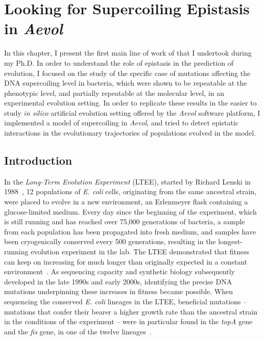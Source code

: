 \chapter{Looking for Supercoiling Epistasis in \emph{Aevol}}
\label{chap:aevol}

In this chapter, I present the first main line of work of that I undertook during my Ph.D.
In order to understand the role of epistasis in the prediction of evolution, I focused on the study of the specific case of mutations affecting the DNA supercoiling level in bacteria, which were shown to be repeatable at the phenotypic level,  and partially repeatable at the molecular level, in an experimental evolution setting.
In order to replicate these results in the easier to study \emph{in silico} artificial evolution setting offered by the \emph{Aevol} software platform, I implemented a model of supercoiling in \emph{Aevol}, and tried to detect epistatic interactions in the evolutionary trajectories of populations evolved in the model.

\section{Introduction}
\label{sec:aevol:intro}

In the \emph{Long-Term Evolution Experiment} (LTEE), started by Richard Lenski in 1988~\citep{lenski1991}, 12 populations of \emph{E. coli} cells, originating from the same ancestral strain, were placed to evolve in a new environment, an Erlenmeyer flask containing a glucose-limited medium.
Every day since the beginning of the experiment, which is still running and has reached over 75,000 generations of bacteria, a sample from each population has been propagated into fresh medium, and samples have been cryogenically conserved every 500 generations, resulting in the longest-running evolution experiment in the lab.
The LTEE demonstrated that fitness can keep on increasing for much longer than originally expected in a constant environment~\citep{good2017}.
As sequencing capacity and synthetic biology subsequently developed in the late 1990s and early 2000s, identifying the precise DNA mutations underpinning these increases in fitness became possible.
When sequencing the conserved \emph{E. coli} lineages in the LTEE, beneficial mutations -- mutations that confer their bearer a higher growth rate than the ancestral strain in the conditions of the experiment -- were in particular found in the \emph{topA} gene  and the \emph{fis} gene, in one of the twelve lineages~\citep{crozat2005}.

